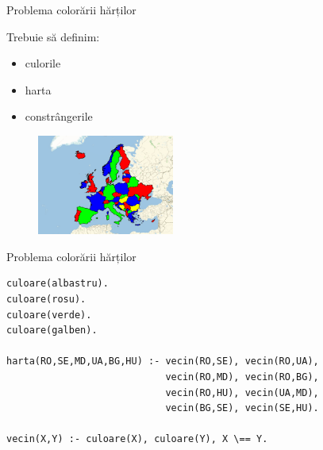 \documentclass[xcolor=pdftex,romanian,colorlinks]{beamer}
\begin{document}
\begin{frame}[fragile]{Problema colorării hărților}


 
 \pause
\begin{multicols}{2}

Trebuie să definim:
\begin{itemize}
\item culorile
\item harta
\item constr\^{a}ngerile
\end{itemize}
\columnbreak
\begin{figure}[h]
    \includegraphics[width=0.4\textwidth]{images/europe1}
    
    \href{https://www.wolfram.com/mathematica/new-in-10/entity-based-geocomputation/find-the-shortest-route-through-the-worlds-capital.html}
    {\footnotesize{}}
\end{figure}
\end{multicols}


\end{frame}


\begin{frame}[fragile]{Problema colorării hărților}



\vspace{-.3cm}
\begin{verbatim}
culoare(albastru).
culoare(rosu).
culoare(verde).
culoare(galben).

harta(RO,SE,MD,UA,BG,HU) :- vecin(RO,SE), vecin(RO,UA), 
                            vecin(RO,MD), vecin(RO,BG),                      	                          
                            vecin(RO,HU), vecin(UA,MD),
                            vecin(BG,SE), vecin(SE,HU).
                            
vecin(X,Y) :- culoare(X), culoare(Y), X \== Y.                      
\end{verbatim}

\end{frame}
\end{document}
